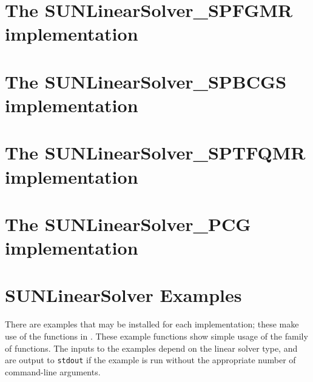 \section{The SUNLinearSolver\_SPFGMR implementation}\label{ss:sunlinsol_spfgmr}


\section{The SUNLinearSolver\_SPBCGS implementation}\label{ss:sunlinsol_spbcgs}


\section{The SUNLinearSolver\_SPTFQMR implementation}\label{ss:sunlinsol_sptfqmr}


\section{The SUNLinearSolver\_PCG implementation}\label{ss:sunlinsol_pcg}



\section{SUNLinearSolver Examples}\label{ss:sunlinsol_examples}

There are  examples that may be installed for each
implementation; these make use of the functions in . 
These example functions show simple usage of the  family
of functions.  The inputs to the examples depend on the linear solver type,
and are output to \texttt{stdout} if the example is run without the
appropriate number of command-line arguments. 

